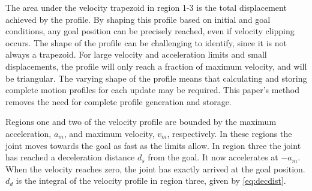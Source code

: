 
The area under the velocity trapezoid in region 1-3 is the total displacement achieved by the
profile. By shaping this profile based on initial and goal conditions, any
goal position can be precisely reached, even if velocity clipping occurs. The
shape of the profile can be challenging to identify, since it is not
always a trapezoid. For large velocity and acceleration
limits and small displacements, the profile will only reach a fraction of maximum velocity, and will be
triangular. The varying shape of the profile means that calculating and storing
complete motion profiles for each update may be required.  This paper's method removes the need
for complete profile generation and storage.




Regions one and two of the velocity profile are bounded by the maximum acceleration, 
$a_m$, and maximum velocity, $v_m$, respectively.  In these regions the joint moves 
towards the goal as fast as the limits allow.
In region three the joint has reached a deceleration distance $d_s$ from the goal.
It now accelerates at $-a_m$.
When the velocity reaches zero, the joint has exactly arrived at the goal position.
$d_d$ is the integral of the velocity profile in region three, given by \eqref{eq:decdist}.





